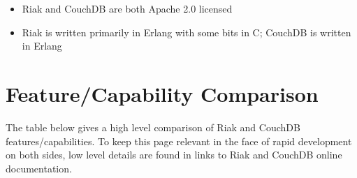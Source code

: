 \documentclass[letter]{book}
\newcounter{tab}[chapter]
\begin{document}
\begin{itemize}
\itemsep1pt\parskip0pt
\item
  Riak and CouchDB are both Apache 2.0 licensed
\item
  Riak is written primarily in Erlang with some bits in C; CouchDB is written in Erlang
\end{itemize}

\section{Feature/Capability Comparison}\label{featurecapability-comparison-2}

The table below gives a high level comparison of Riak and CouchDB features/capabilities. To keep this page relevant in the face of rapid development on both sides, low level details are found in links to Riak and CouchDB online documentation.
\end{document}

